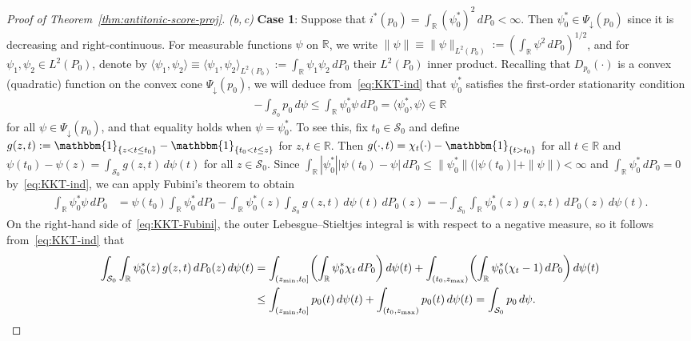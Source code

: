 \documentclass[a4paper]{article}
\newcommand{\R}{\mathbb{R}}
\newcommand{\Ind}{\mathbbm{1}}
\newcommand{\norm}[1]{\|{#1}\|}
\newcommand{\ipr}[2]{\langle #1, #2 \rangle}
\theoremstyle{definition}
\begin{document}
\begin{proof}[Proof of Theorem~\ref{thm:antitonic-score-proj}]
\medskip
\noindent
\textit{(b,\,c)} \textbf{Case 1}: Suppose that $i^*(p_0) = \int_\R(\psi_0^*)^2\,dP_0 < \infty$. Then $\psi_0^* \in \Psi_\downarrow(p_0)$ since it is decreasing and right-continuous. For measurable functions $\psi$ on $\R$, we write $\norm{\psi} \equiv \norm{\psi}_{L^2(P_0)} := (\int_\R\psi^2\,dP_0)^{1/2}$, and for $\psi_1,\psi_2 \in L^2(P_0)$, denote by $\ipr{\psi_1}{\psi_2} \equiv \ipr{\psi_1}{\psi_2}_{L^2(P_0)} := \int_\R \psi_1\psi_2\,dP_0$ their $L^2(P_0)$ inner product. Recalling that $D_{p_0}(\cdot)$ is a convex (quadratic) function on the convex cone $\Psi_\downarrow(p_0)$, we will deduce from~\eqref{eq:KKT-ind} that $\psi_0^*$ satisfies the first-order stationarity condition
\begin{align}
\label{eq:KKT}
-\int_{\mathcal{S}_0} p_0\,d\psi \leq \int_\R\psi_0^*\psi\,dP_0 = \ipr{\psi_0^*}{\psi} \in \R
\end{align}
for all $\psi \in \Psi_\downarrow(p_0)$, and that equality holds when $\psi = \psi_0^*$. To see this, fix $t_0 \in \mathcal{S}_0$ and define $g(z,t) := \Ind_{\{z < t \leq t_0\}} - \Ind_{\{t_0 < t \leq z\}}$ for $z,t \in \R$. Then $g(\cdot,t) = \chi_t(\cdot) - \Ind_{\{t > t_0\}}$ for all $t \in \R$ and $\psi(t_0) - \psi(z) = \int_{\mathcal{S}_0} g(z,t)\,d\psi(t)$ for all $z \in \mathcal{S}_0$. Since $\int_\R|\psi_0^*||\psi(t_0) - \psi|\,dP_0 \leq \norm{\psi_0^*}\bigl(|\psi(t_0)| + \norm{\psi}\bigr) < \infty$ and $\int_\R\psi_0^*\,dP_0 = 0$ by~\eqref{eq:KKT-ind}, we can apply Fubini's theorem to obtain
\begin{align}
\label{eq:KKT-Fubini}
\int_\R\psi_0^*\psi\,dP_0 &= \psi(t_0)\int_\R\psi_0^*\,dP_0-\int_\R\psi_0^*(z)\int_{\mathcal{S}_0} g(z,t)\,d\psi(t)\,dP_0(z) = -\int_{\mathcal{S}_0}\int_\R \psi_0^*(z)\,g(z,t)\,dP_0(z)\,d\psi(t).
\end{align}
On the right-hand side of~\eqref{eq:KKT-Fubini}, the outer Lebesgue--Stieltjes integral is with respect to a negative measure, so it follows from~\eqref{eq:KKT-ind} that
\begin{align}
\int_{\mathcal{S}_0}\int_\R \psi_0^*(z)\,g(z,t)\,dP_0(z)\,d\psi(t) &= \int_{(z_{\min},t_0]}\biggl(\int_\R\psi_0^*\chi_t\,dP_0\biggr)\,d\psi(t) + \int_{(t_0,z_{\max})}\biggl(\int_\R\psi_0^*(\chi_t - 1)\,dP_0\biggr)\,d\psi(t)\notag \\
\label{eq:KKT-integrals}
&\leq \int_{(z_{\min},t_0]}p_0(t)\,d\psi(t) + \int_{(t_0,z_{\max})}p_0(t)\,d\psi(t) = \int_{\mathcal{S}_0}p_0\,d\psi.
\end{align}

\end{proof}
\end{document}
